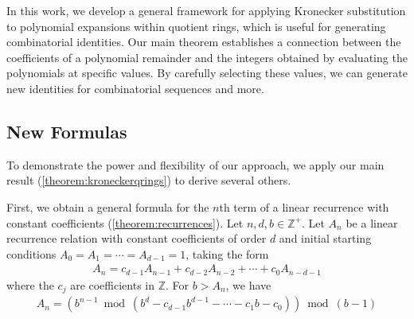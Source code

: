 \documentclass[11pt,reqno]{article}
\theoremstyle{plain}
\theoremstyle{definition}
\begin{document}
In this work, we develop a general framework for applying Kronecker substitution to polynomial expansions within quotient rings, which is useful for generating combinatorial identities. Our main theorem establishes a connection between the coefficients of a polynomial remainder and the integers obtained by evaluating the polynomials at specific values. By carefully selecting these values, we can generate new identities for combinatorial sequences and more.

\subsection{New Formulas}
To demonstrate the power and flexibility of our approach, we apply our main result (\cref{theorem:kroneckerqrings}) to derive several others.

First, we obtain a general formula for the $n$th term of a linear recurrence with constant coefficients (\cref{theorem:recurrences}). Let $n,d,b \in \mathbb{Z}^+$. Let $A_n$ be a linear recurrence relation with constant coefficients of order $d$ and initial starting conditions $A_0=A_1=\cdots=A_{d-1}=1$, taking the form
\begin{align*}
    A_{n} = c_{d-1} A_{n-1} + c_{d-2} A_{n-2} + \cdots + c_{0} A_{n-d-1}
\end{align*}
where the $c_j$ are coefficients in $\mathbb{Z}$. For $b > A_n$, we have
\begin{align*}
    A_{n} = \left( b^{n-1} \bmod{(b^d - c_{d-1} b^{d-1} - \cdots -  c_1 b - c_0 )} \right) \bmod{(b-1)}
\end{align*}
\end{document}
